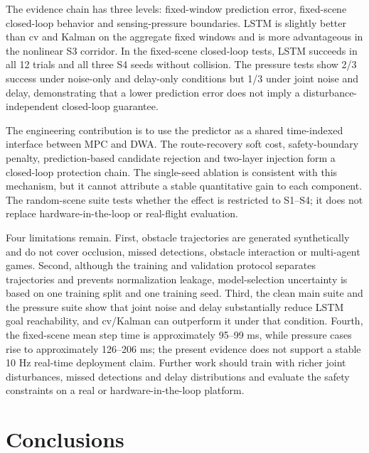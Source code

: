 \documentclass[10pt,a4paper]{article}
\begin{document}
The evidence chain has three levels: fixed-window prediction error, fixed-scene closed-loop behavior and sensing-pressure boundaries. LSTM is slightly better than cv and Kalman on the aggregate fixed windows and is more advantageous in the nonlinear S3 corridor. In the fixed-scene closed-loop tests, LSTM succeeds in all 12 trials and all three S4 seeds without collision. The pressure tests show 2/3 success under noise-only and delay-only conditions but 1/3 under joint noise and delay, demonstrating that a lower prediction error does not imply a disturbance-independent closed-loop guarantee.

The engineering contribution is to use the predictor as a shared time-indexed interface between MPC and DWA. The route-recovery soft cost, safety-boundary penalty, prediction-based candidate rejection and two-layer injection form a closed-loop protection chain. The single-seed ablation is consistent with this mechanism, but it cannot attribute a stable quantitative gain to each component. The random-scene suite tests whether the effect is restricted to S1–S4; it does not replace hardware-in-the-loop or real-flight evaluation.

Four limitations remain. First, obstacle trajectories are generated synthetically and do not cover occlusion, missed detections, obstacle interaction or multi-agent games. Second, although the training and validation protocol separates trajectories and prevents normalization leakage, model-selection uncertainty is based on one training split and one training seed. Third, the clean main suite and the pressure suite show that joint noise and delay substantially reduce LSTM goal reachability, and cv/Kalman can outperform it under that condition. Fourth, the fixed-scene mean step time is approximately 95–99 ms, while pressure cases rise to approximately 126–206 ms; the present evidence does not support a stable 10 Hz real-time deployment claim. Further work should train with richer joint disturbances, missed detections and delay distributions and evaluate the safety constraints on a real or hardware-in-the-loop platform.

\section{Conclusions}
\end{document}
